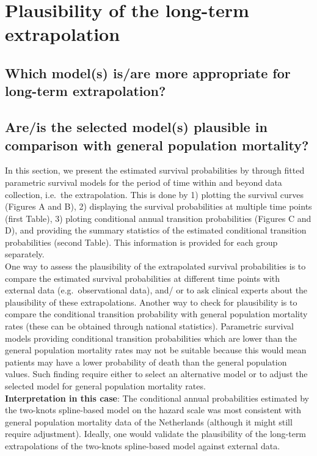 \documentclass[
]{article}
\begin{document}
\hypertarget{plausibility-of-the-long-term-extrapolation}{%
\section{Plausibility of the long-term
extrapolation}\label{plausibility-of-the-long-term-extrapolation}}

\hypertarget{which-models-isare-more-appropriate-for-long-term-extrapolation}{%
\subsection{Which model(s) is/are more appropriate for long-term
extrapolation?}\label{which-models-isare-more-appropriate-for-long-term-extrapolation}}

\hypertarget{areis-the-selected-models-plausible-in-comparison-with-general-population-mortality}{%
\subsection{Are/is the selected model(s) plausible in comparison with
general population
mortality?}\label{areis-the-selected-models-plausible-in-comparison-with-general-population-mortality}}

In this section, we present the estimated survival probabilities by
through fitted parametric survival models for the period of time within
and beyond data collection, i.e.~the extrapolation. This is done by 1)
plotting the survival curves (Figures A and B), 2) displaying the
survival probabilities at multiple time points (first Table), 3) ploting
conditional annual transition probabilities (Figures C and D), and
providing the summary statistics of the estimated conditional transition
probabilities (second Table). This information is provided for each
group separately.\\
One way to assess the plausibility of the extrapolated survival
probabilities is to compare the estimated survival probabilities at
different time points with external data (e.g.~observational data), and/
or to ask clinical experts about the plausibility of these
extrapolations. Another way to check for plausibility is to compare the
conditional transition probability with general population mortality
rates (these can be obtained through national statistics). Parametric
survival models providing conditional transition probabilities which are
lower than the general population mortality rates may not be suitable
because this would mean patients may have a lower probability of death
than the general population values. Such finding require either to
select an alternative model or to adjust the selected model for general
population mortality rates.\\
\textbf{Interpretation in this case}: The conditional annual
probabilities estimated by the two-knots spline-based model on the
hazard scale was most consistent with general population mortality data
of the Netherlands (although it might still require adjustment).
Ideally, one would validate the plausibility of the long-term
extrapolations of the two-knots spline-based model against external
data.
\end{document}
